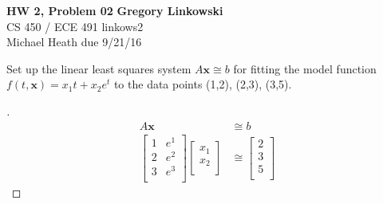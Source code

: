 \documentclass[12pt]{article}
\newenvironment{exercise}[2][Exercise]{\begin{trivlist}
\item[\hskip \labelsep {\bfseries #1}\hskip \labelsep {\bfseries #2.}]}{\end{trivlist}}
\begin{document}
\noindent
\large\textbf{HW 2, Problem 02} \hfill \textbf{Gregory Linkowski} \\
\normalsize CS 450 / ECE 491 \hfill linkows2 \\
Michael Heath \hfill due 9/21/16 \\



\begin{exercise}{1} 
	Set up the linear least squares system $A \bm{x} \cong b$ for fitting the model function  $f(t,\bm{x}) = x_1 t + x_2 e^t$  to the data points (1,2), (2,3), (3,5). \\ 
\end{exercise}

\begin{proof}[]
	\begin{align*}
		A \bm{x} &\cong b \\ 
		\begin{bmatrix}
			1 & e^1 \\
			2 & e^2 \\
			3 & e^3 \\
		\end{bmatrix} 
		\begin{bmatrix}
			x_1 \\
			x_2 \\
		\end{bmatrix} 
		&\cong
		\begin{bmatrix}
			2 \\
			3 \\
			5 \\
		\end{bmatrix}
	\end{align*}
\end{proof}
\end{document}
